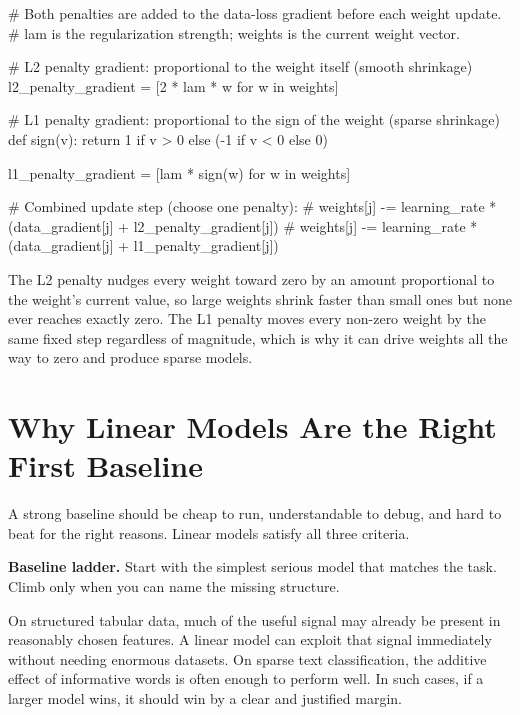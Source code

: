 \begin{codeexample}[caption={From scratch: L2 versus L1 gradient penalty}]
# Both penalties are added to the data-loss gradient before each weight update.
# lam is the regularization strength; weights is the current weight vector.

# L2 penalty gradient: proportional to the weight itself (smooth shrinkage)
l2_penalty_gradient = [2 * lam * w for w in weights]

# L1 penalty gradient: proportional to the sign of the weight (sparse shrinkage)
def sign(v):
    return 1 if v > 0 else (-1 if v < 0 else 0)

l1_penalty_gradient = [lam * sign(w) for w in weights]

# Combined update step (choose one penalty):
# weights[j] -= learning_rate * (data_gradient[j] + l2_penalty_gradient[j])
# weights[j] -= learning_rate * (data_gradient[j] + l1_penalty_gradient[j])
\end{codeexample}

The L2 penalty nudges every weight toward zero by an amount proportional to the weight's current value, so large weights shrink faster than small ones but none ever reaches exactly zero. The L1 penalty moves every non-zero weight by the same fixed step regardless of magnitude, which is why it can drive weights all the way to zero and produce sparse models.

\section{Why Linear Models Are the Right First Baseline}

A strong baseline should be cheap to run, understandable to debug, and hard to beat for the right reasons. Linear models satisfy all three criteria.

\begin{thinkingtool}
\textbf{Baseline ladder.} Start with the simplest serious model that matches the task. Climb only when you can name the missing structure.
\end{thinkingtool}

On structured tabular data, much of the useful signal may already be present in reasonably chosen features. A linear model can exploit that signal immediately without needing enormous datasets. On sparse text classification, the additive effect of informative words is often enough to perform well. In such cases, if a larger model wins, it should win by a clear and justified margin.

